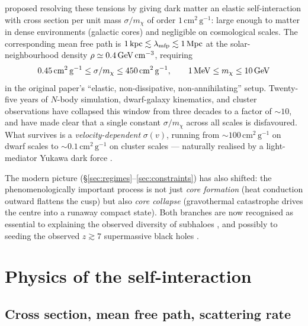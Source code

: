 \documentclass[12pt]{article}
\newcommand{\cmg}{\,\mathrm{cm^2\,g^{-1}}}
\newcommand{\smx}{\sigma/m_\chi}
\newcommand{\mfp}{\lambda_{\rm mfp}}
\begin{document}
\citet{SpergelSteinhardt2000} proposed resolving these tensions by
giving dark matter an elastic self-interaction with cross section per
unit mass $\smx$ of order $1\cmg$: large enough to matter in dense
environments (galactic cores) and negligible on cosmological scales.
The corresponding mean free path is $1\,{\rm kpc}\lesssim
\mfp\lesssim 1\,{\rm Mpc}$ at the solar-neighbourhood density
$\rho\simeq 0.4\,{\rm GeV\,cm^{-3}}$, requiring
\citep{SpergelSteinhardt2000}
%
\begin{equation}
  0.45\cmg \le \smx \le 450\cmg,
  \qquad
  1\,{\rm MeV} \le m_\chi \le 10\,{\rm GeV}
\end{equation}
%
in the original paper's ``elastic, non-dissipative, non-annihilating''
setup.  Twenty-five years of $N$-body simulation, dwarf-galaxy
kinematics, and cluster observations have collapsed this window from
three decades to a factor of $\sim\!10$, and have made clear that a
single constant $\smx$ across all scales is disfavoured.  What
survives is a \emph{velocity-dependent} $\sigma(v)$, running from
$\sim\!100\cmg$ on dwarf scales to $\sim\!0.1\cmg$ on cluster scales
--- naturally realised by a light-mediator Yukawa dark force
\citep{Kaplinghat2016,TulinYu2018}.

The modern picture (\S\ref{sec:regimes}--\ref{sec:constraints}) has
also shifted: the phenomenologically important process is not just
\emph{core formation} (heat conduction outward flattens the cusp) but
also \emph{core collapse} (gravothermal catastrophe drives the centre
into a runaway compact state).  Both branches are now recognised as
essential to explaining the observed diversity of subhaloes
\citep{Zeng2022,Nadler2023}, and possibly to seeding the observed
$z\gtrsim 7$ supermassive black holes
\citep{Pollack2015,Feng2021}.

\section{Physics of the self-interaction}
\label{sec:physics}

\subsection{Cross section, mean free path, scattering rate}
\end{document}
